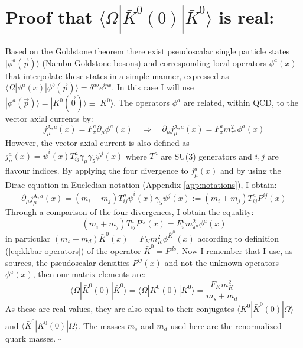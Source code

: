 \documentclass[english, LaM, oneside, noexaminfo]{sapthesis}
\newcommand{\la}{\langle}
\newcommand{\ra}{\rangle}
\newcommand{\proved}{\newline \hspace*{.97\textwidth} $\square$}
\begin{document}
\section{Proof that $\la \Omega | \bar K^0 (0) | \bar K^0 \ra$ is real:}\label{app:proof-reality}
\noindent
Based on the Goldstone theorem \cite{Goldstone-Theorem} there exist pseudoscalar single particle states $| \phi^a (\vec p) \ra$ (Nambu Goldstone bosons) and corresponding local operators $\phi^a(x)$ that interpolate these states in a simple manner, expressed as $\la\Omega | \phi^a (x) | \phi^b (\vec p) \ra = \delta^{ab}e^{ipx} $.
In this case I will use $|\phi^a(\vec p)\ra = | K^0 (\vec 0)\ra \equiv | K^0 \ra$.
The operators $\phi^a$ are related, within QCD, to the vector axial currents by:
\begin{equation*}
    j_\mu^{\text{A},a} (x) = F_\pi^a \partial_\mu \phi^a (x)
    \quad \Rightarrow \quad
    \partial_\mu j_\mu^{\text{A},a} (x) = F_\pi^a m_{\pi^a}^2 \phi^a (x)
\end{equation*}
However, the vector axial current is also defined as $j_\mu^a(x) = \bar \psi^i (x) T^a_{ij}\gamma_\mu \gamma_5 \psi^j (x)$ where $T^a$ are SU(3) generators and $i,j$ are flavour indices.
By applying the four divergence to $j_\mu^a(x)$ and by using the Dirac equation in Eucledian notation (Appendix \ref{app:notations}), I obtain:
\begin{equation*}
    \partial_\mu j_\mu^{\text{A},a} (x) = (m_i + m_j) T^a_{ij}\bar\psi^i (x) \gamma_5 \psi^j (x) := (m_i + m_j) T^a_{ij} P^{ij}(x)
\end{equation*}
Through a comparison of the four divergences, I obtain the equality:
\begin{equation*}
    (m_i + m_j) T^a_{ij} P^{ij}(x) = F_\pi^a m_{\pi^a}^2 \phi^a (x)
\end{equation*}
in particular $(m_s + m_d) \bar K^0(x) = F_K m_{K}^2 \phi^{\bar K^0} (x)$ according to definition (\ref{eq:kkbar-operators}) of the operator $\bar K^0 = P^{ds}$.
Now I remember that I use, as sources, the pseudoscalar densities $P^{ij}(x)$ and not the unknown operators $\phi^a (x)$, then our matrix elements are:
\begin{equation*}
    \la \Omega | \bar K^0 (0) |  \bar K^0 \ra = \la \Omega | K^0 (0) | K^0 \ra = \frac{F_K m_K^2}{m_s + m_d}
\end{equation*}
As these are real values, they are also equal to their conjugates  $\la K^0  | \bar K^0 (0) |  \Omega\ra$ and $\la\bar K^0 | K^0 (0) | \Omega\ra$.
The masses $m_s$ and $m_d$ used here are the renormalized quark masses.
\proved
\end{document}
